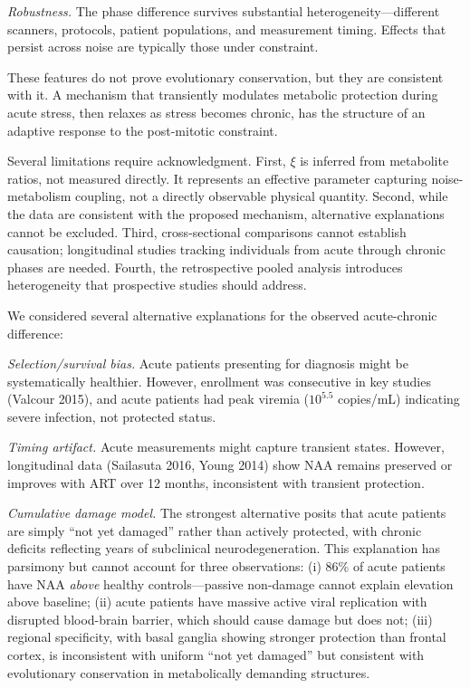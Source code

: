 \documentclass[10pt,a4paper]{article}
\begin{document}
\textit{Robustness.} The phase difference survives substantial heterogeneity---different scanners, protocols, patient populations, and measurement timing. Effects that persist across noise are typically those under constraint.

These features do not prove evolutionary conservation, but they are consistent with it. A mechanism that transiently modulates metabolic protection during acute stress, then relaxes as stress becomes chronic, has the structure of an adaptive response to the post-mitotic constraint.

Several limitations require acknowledgment. First, $\xi$ is inferred from metabolite ratios, not measured directly. It represents an effective parameter capturing noise-metabolism coupling, not a directly observable physical quantity. Second, while the data are consistent with the proposed mechanism, alternative explanations cannot be excluded. Third, cross-sectional comparisons cannot establish causation; longitudinal studies tracking individuals from acute through chronic phases are needed. Fourth, the retrospective pooled analysis introduces heterogeneity that prospective studies should address.

We considered several alternative explanations for the observed acute-chronic difference:

\textit{Selection/survival bias.} Acute patients presenting for diagnosis might be systematically healthier. However, enrollment was consecutive in key studies (Valcour 2015), and acute patients had peak viremia ($10^{5.5}$ copies/mL) indicating severe infection, not protected status.

\textit{Timing artifact.} Acute measurements might capture transient states. However, longitudinal data (Sailasuta 2016, Young 2014) show NAA remains preserved or improves with ART over 12 months, inconsistent with transient protection.

\textit{Cumulative damage model.} The strongest alternative posits that acute patients are simply ``not yet damaged'' rather than actively protected, with chronic deficits reflecting years of subclinical neurodegeneration. This explanation has parsimony but cannot account for three observations: (i) 86\% of acute patients have NAA \textit{above} healthy controls---passive non-damage cannot explain elevation above baseline; (ii) acute patients have massive active viral replication with disrupted blood-brain barrier, which should cause damage but does not; (iii) regional specificity, with basal ganglia showing stronger protection than frontal cortex, is inconsistent with uniform ``not yet damaged'' but consistent with evolutionary conservation in metabolically demanding structures.
\end{document}
